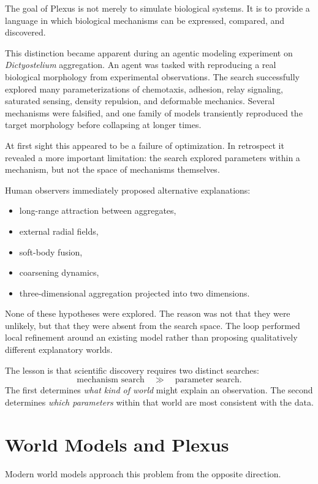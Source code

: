 \documentclass[11pt]{article}
\begin{document}
The goal of Plexus is not merely to simulate biological systems. It is to provide
a language in which biological mechanisms can be expressed, compared, and
discovered.

This distinction became apparent during an agentic modeling experiment on
\emph{Dictyostelium} aggregation. An agent was tasked with reproducing a real
biological morphology from experimental observations. The search successfully
explored many parameterizations of chemotaxis, adhesion, relay signaling,
saturated sensing, density repulsion, and deformable mechanics. Several
mechanisms were falsified, and one family of models transiently reproduced the
target morphology before collapsing at longer times.

At first sight this appeared to be a failure of optimization. In retrospect it
revealed a more important limitation: the search explored parameters within a
mechanism, but not the space of mechanisms themselves.

Human observers immediately proposed alternative explanations:

\begin{itemize}
\item long-range attraction between aggregates,
\item external radial fields,
\item soft-body fusion,
\item coarsening dynamics,
\item three-dimensional aggregation projected into two dimensions.
\end{itemize}

None of these hypotheses were explored. The reason was not that they were
unlikely, but that they were absent from the search space. The loop performed
local refinement around an existing model rather than proposing qualitatively
different explanatory worlds.

The lesson is that scientific discovery requires two distinct searches:
\[
\text{mechanism search}
\quad\gg\quad
\text{parameter search}.
\]
The first determines \emph{what kind of world} might explain an observation.
The second determines \emph{which parameters} within that world are most
consistent with the data.

\section{World Models and Plexus}
\label{sec:worldmodels}

Modern world models approach this problem from the opposite direction.
\end{document}
